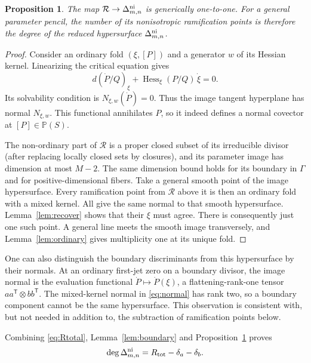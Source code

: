 \documentclass[11pt]{article}
\newtheorem{proposition}[theorem]{Proposition}
\newcommand{\PP}{\mathbb P}
\begin{document}
\begin{proposition}\label{prop:birational}
The map $\mathcal R\to\Delta^{\rm ni}_{m,n}$ is generically one-to-one.
For a general parameter pencil, the number of its nonisotropic
ramification points is therefore the degree of the reduced
hypersurface $\Delta^{\rm ni}_{m,n}$.
\end{proposition}
\begin{proof}
Consider an ordinary fold $(\xi,[P])$ and a generator $w$ of its
Hessian kernel. Linearizing the critical equation gives
\[
 d(\dot P/Q)_\xi+\operatorname{Hess}_\xi(P/Q)\,\dot\xi=0.
\]
Its solvability condition is $N_{\xi,w}(\dot P)=0$. Thus the image
tangent hyperplane has normal $N_{\xi,w}$. This functional annihilates
$P$, so it indeed defines a normal covector at $[P]\in\PP(S)$.

The non-ordinary part of $\mathcal R$ is a proper closed subset of
its irreducible divisor (after replacing locally closed sets by
closures), and its parameter image has dimension at most $M-2$.
The same dimension bound holds for its boundary in $\Gamma$ and for
positive-dimensional fibers. Take a general smooth point of the
image hypersurface. Every ramification point from $\mathcal R$ above
it is then an ordinary fold with a mixed kernel. All give the same
normal to that smooth hypersurface. Lemma~\ref{lem:recover} shows
that their $\xi$ must agree. There is consequently just one such
point. A general line meets the smooth image transversely, and
Lemma~\ref{lem:ordinary} gives multiplicity one at its unique fold.
\end{proof}

One can also distinguish the boundary discriminants from this
hypersurface by their normals. At an ordinary first-jet zero on a
boundary divisor, the image normal is the evaluation functional
$\dot P\mapsto\dot P(\xi)$, a flattening-rank-one tensor
$aa^{\mathsf T}\otimes bb^{\mathsf T}$. The mixed-kernel normal in
\eqref{eq:normal} has rank two, so a boundary component cannot be the
same hypersurface. This observation is consistent with, but not
needed in addition to, the subtraction of ramification points below.

Combining \eqref{eq:Rtotal}, Lemma~\ref{lem:boundary} and
Proposition~\ref{prop:birational} proves
\begin{equation}\label{eq:subtraction}
 \deg\Delta^{\rm ni}_{m,n}=R_{\rm tot}-\delta_a-\delta_b.
\end{equation}
\end{document}
